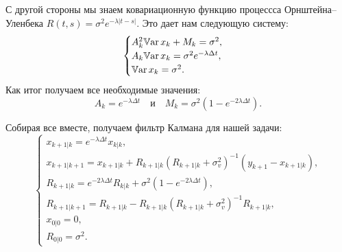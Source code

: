 С другой стороны мы знаем ковариационную функцию процессса Орнштейна--Уленбека $R(t,s) = \sigma^2e^{-\lambda|t-s|}$. Это дает нам следующую систему:
$$
        \begin{cases}
A_k^2 \mathbb{V}\mbox{ar}\,x_k + M_k = \sigma^2,
        \\
A_k \mathbb{V}\mbox{ar}\,x_k = \sigma^2 e^{-\lambda\Delta t},
        \\
\mathbb{V}\mbox{ar}\,x_k = \sigma^2.
        \end{cases}
$$
Как итог получаем все необходимые значения:
$$
        A_k = e^{-\lambda \Delta t}
\quad
\mbox{и}
\quad
        M_k = \sigma^2\left(1- e^{-2\lambda\Delta t}\right).
$$

Собирая все вместе, получаем фильтр Калмана для нашей задачи:
$$
        \begin{cases}
x_{k+1|k}
=
e^{-\lambda\Delta t} x_{k|k},
        \\
x_{k+1|k+1}
=
x_{k+1|k}
+
R_{k+1|k}
(
        R_{k+1|k}
        +
        \sigma^2_v
)^{-1}
(
        y_{k+1}
        -
        x_{k+1|k}
),
        \\
R_{k+1|k}
=
e^{-2\lambda\Delta t}
R_{k|k}
+\sigma^2(1 - e^{-2\lambda\Delta t}),
        \\
R_{k+1|k+1}
=
R_{k+1|k}
-
R_{k+1|k}
(
        R_{k+1|k}
        +
        \sigma^2_v
)^{-1}
R_{k+1|k},
        \\
x_{0|0} = 0,
        \\
R_{0|0} = \sigma^2.
        \end{cases}
$$


